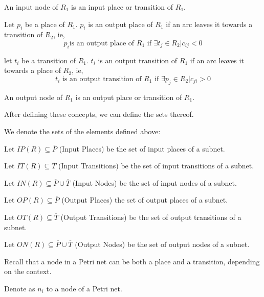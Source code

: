 {\begin{definition}
An input node of $R_1$ is an input place or transition of $R_1$.
\end{definition}

\begin{definition}
Let $p_i$ be a place of $R_1$. $p_i$ is an output place of $R_1$
if an arc leaves it towards a transition of $R_2$, ie,
\[
p_i \mbox{is an output place of } R_1 \mbox{ if } \exists t_j \in R_2 | c_{ij} < 0
\]
\end{definition}

\begin{definition}
let $t_i$ be a transition of $R_1$. $t_i$ is an output transition of $R_1$ if an arc leaves it towards a place of $R_2$, ie,
\[
t_i \mbox{ is an output transition of } R_1 \mbox{ if } \exists p_j \in R_2 | c_{ji} > 0
\]
\end{definition}

\begin{definition}
An output node of $R_1$ is an output place or transition of $R_1$.
\end{definition}

After defining these concepts, we can define the sets thereof.

\begin{notation}
We denote the sets of the elements defined above:
 \begin{shortitemize}
  \item Let $IP(R) \subseteq  \overline P$ (Input Places) be the set of input  places of a subnet.
  \item Let $IT(R) \subseteq \overline T$ (Input Transitions) be the set of input transitions of a subnet.
  \item Let $IN(R) \subseteq \overline P \cup \overline T$ (Input Nodes)
        be the set of input nodes of a subnet.
  \item Let $OP(R) \subseteq  \overline P$ (Output Places) the set of output places of a subnet.
  \item Let $OT(R) \subseteq \overline T$ (Output Transitions) be the set of output transitions of a subnet.
  \item Let $ON(R) \subseteq \overline P \cup \overline T$ (Output Nodes)
        be the set of output nodes of a subnet.
\end{shortitemize}
\end{notation}

\begin{note}
Recall that a node in a Petri net can be both a place and a transition, depending on the context.
\end{note}
\begin{notation}
Denote as $ n_i $ to a node of a Petri net.
\end{notation}

}
